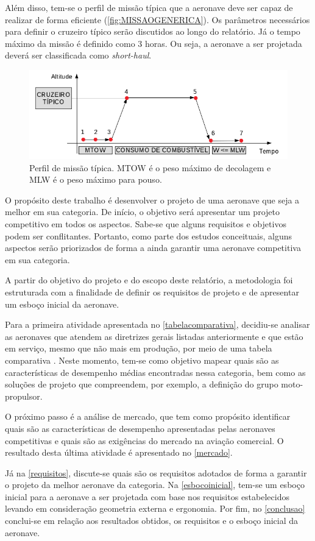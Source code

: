 Além disso, tem-se o perfil de missão típica que a aeronave deve ser capaz de realizar de forma eficiente (\autoref{fig:MISSAOGENERICA}).
Os parâmetros necessários para definir o cruzeiro típico serão discutidos ao longo do relatório.
Já o tempo máximo da missão é definido como 3 horas. Ou seja, a aeronave a ser projetada deverá ser classificada como \emph{short-haul}.

\begin{figure}
\centering
\includegraphics[width=120mm]{images/parte1/MISSAO_GENERICA}
\caption[Perfil de missão típica]{Perfil de missão típica. MTOW é o peso máximo de decolagem e MLW é o peso máximo para pouso.}
\label{fig:MISSAOGENERICA}
\end{figure}

O propósito deste trabalho é desenvolver o projeto de uma aeronave que seja a melhor em sua categoria.
De início, o objetivo será apresentar um projeto competitivo em todos os aspectos.
Sabe-se que alguns requisitos e objetivos podem ser conflitantes.
Portanto, como parte dos estudos conceituais, alguns aspectos serão priorizados de forma a ainda garantir uma aeronave competitiva em sua categoria.

A partir do objetivo do projeto e do escopo deste relatório, a metodologia foi estruturada com a finalidade de definir os requisitos de projeto e de apresentar um esboço inicial da aeronave.

Para a primeira atividade apresentada no \autoref{tabelacomparativa}, decidiu-se analisar as aeronaves que atendem as diretrizes gerais listadas anteriormente e que estão em serviço, mesmo que não mais em produção, por meio de uma tabela comparativa \cite{barros}.
Neste momento, tem-se como objetivo mapear quais são as características de desempenho médias encontradas nessa categoria, bem como as soluções de projeto que compreendem, por exemplo, a definição do grupo moto-propulsor.

O próximo passo é a análise de mercado, que tem como propósito identificar quais são as características de desempenho apresentadas pelas aeronaves competitivas e quais são as exigências do mercado na aviação comercial.
O resultado desta última atividade é apresentado no \autoref{mercado}.

Já na \autoref{requisitos}, discute-se quais são os requisitos adotados de forma a garantir o projeto da melhor aeronave da categoria. Na \autoref{esbocoinicial}, tem-se um esboço inicial para a aeronave a ser projetada com base nos requisitos estabelecidos levando em consideração geometria externa e ergonomia. Por fim, no \autoref{conclusao} conclui-se em relação aos resultados obtidos, os requisitos e o esboço inicial da aeronave.
